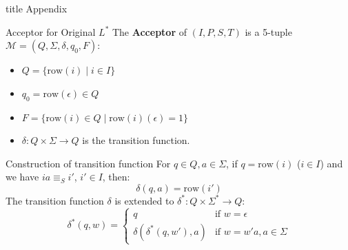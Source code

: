 \documentclass{beamer}
\begin{document}
\appendix

\begin{frame}[plain]
    \begin{center}
        \begin{beamercolorbox}[sep=12pt,center,rounded=true,shadow=true]{title}
            Appendix\par
        \end{beamercolorbox}
    \end{center}
\end{frame}

\begin{frame}{Acceptor for Original $L^*$}
    The \textbf{Acceptor} of $(I,P,S,T)$ is a 5-tuple $\mathcal{M} = (Q,\Sigma,\delta,q_0,F)$:
    \begin{itemize}
        \item $Q = \{\text{row}(i) \mid i \in I\}$
        \item $q_0 = \text{row}(\epsilon) \in Q$
        \item $F = \{\text{row}(i) \in Q \mid \text{row}(i)(\epsilon) = 1\}$
        \item $\delta \colon Q \times \Sigma \to Q$ is the transition function.
    \end{itemize}
    \begin{block}{Construction of transition function}
        For $q \in Q, a \in \Sigma$, if $q = \text{row}(i)$ ($i \in I$) and we have
        $ia \equiv_{S} i'$, $i' \in I$, then:
        \[
            \delta(q,a) = \text{row}(i')
        \]
        The transition function $\delta$ is extended to $\delta^{*} \colon Q \times \Sigma^{*} \to Q$:
        \[
            \delta^{*}(q,w) = 
            \begin{cases}
                q & \text{if } w = \epsilon \\
                \delta(\delta^*(q,w'),a) & \text{if } w = w'a, a \in \Sigma
            \end{cases}
        \]
    \end{block}
\end{frame}
\end{document}
